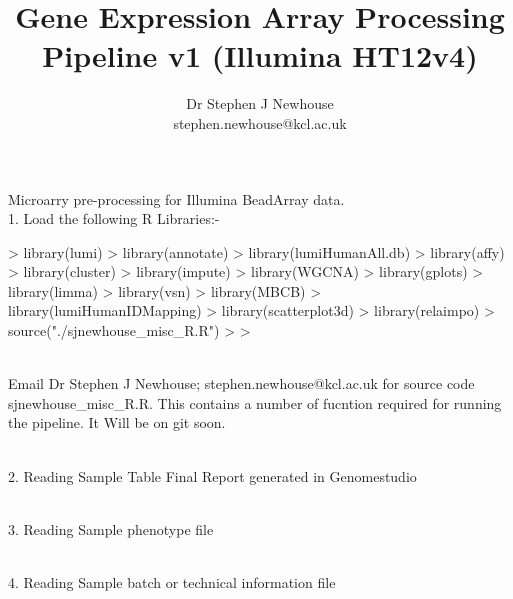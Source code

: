 \documentclass[a4paper]{article}
\title{Gene Expression Array Processing Pipeline v1 (Illumina HT12v4)}
\author{Dr Stephen J Newhouse \\stephen.newhouse@kcl.ac.uk}
\begin{document}
\maketitle

Microarry pre-processing for Illumina BeadArray data.
\\
1. Load the following R Libraries:-

\begin{Schunk}
\begin{Sinput}
> library(lumi)
> library(annotate)
> library(lumiHumanAll.db)
> library(affy)
> library(cluster)
> library(impute)
> library(WGCNA)
> library(gplots)
> library(limma)
> library(vsn)
> library(MBCB)
> library(lumiHumanIDMapping)
> library(scatterplot3d)
> library(relaimpo)
> source("./sjnewhouse_misc_R.R")
> 
> 
\end{Sinput}
\end{Schunk}

\\
Email Dr Stephen J Newhouse; stephen.newhouse@kcl.ac.uk for source code sjnewhouse\_misc\_R.R.
This contains a number of fucntion required for running the pipeline. It Will be on git soon.



\\
2. Reading Sample Table Final Report generated in Genomestudio


\\
3. Reading Sample phenotype file


\\
4. Reading Sample batch or technical information file
\end{document}
